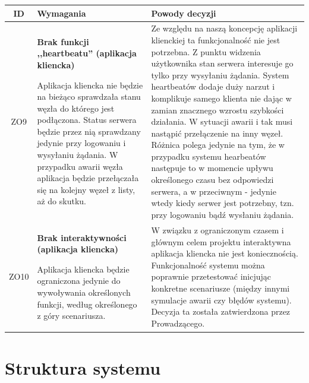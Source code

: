 \pagebreak

\begin{tabularx}{\textwidth}{|c|X|X|}
\hline
\textbf{ID} & \textbf{Wymagania}  & \textbf{Powody decyzji} \\
\hline
\label{z:ZO9} ZO9 &  \textbf{Brak funkcji ,,heartbeatu'' (aplikacja kliencka)}

Aplikacja kliencka nie będzie na bieżąco sprawdzała stanu węzła do którego jest podłączona. Status serwera będzie przez nią sprawdzany jedynie przy logowaniu i wysyłaniu żądania. W przypadku awarii węzła aplikacja będzie przełączała się na kolejny węzeł z listy, aż do skutku. & 
Ze względu na naszą koncepcję aplikacji klienckiej ta funkcjonalność nie jest potrzebna. Z punktu widzenia użytkownika stan serwera interesuje go tylko przy wysyłaniu żądania. System heartbeatów dodaje duży narzut i komplikuje samego klienta nie dając w zamian znacznego wzrostu szybkości działania. W sytuacji awarii i tak musi nastąpić przełączenie na inny węzeł. Różnica polega jedynie na tym, że w przypadku systemu hearbeatów następuje to w momencie upływu określonego czasu bez odpowiedzi serwera, a w przeciwnym - jedynie wtedy kiedy serwer jest potrzebny, tzn. przy logowaniu bądź wysłaniu żądania.\\
\hline

\label{z:ZO10} ZO10 &  \textbf{Brak interaktywności (aplikacja kliencka)}

Aplikacja kliencka będzie ograniczona jedynie do wywoływania określonych funkcji, według określonego z góry scenariusza. & 
W związku z ograniczonym czasem i głównym celem projektu interaktywna aplikacja kliencka nie jest koniecznością. Funkcjonalność systemu można poprawnie przetestować inicjując konkretne scenariusze (między innymi symulacje awarii czy błędów systemu). Decyzja ta została zatwierdzona przez Prowadzącego.\\
\hline

\end{tabularx}

\section[Struktura systemu]{Struktura systemu}

